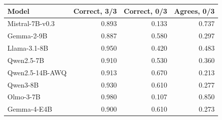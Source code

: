 \begin{tabular}{lrrr}
\toprule
Model & Correct, 3/3 & Correct, 0/3 & Agrees, 0/3 \\
\midrule
Mistral-7B-v0.3 & 0.893 & 0.133 & 0.737 \\
Gemma-2-9B & 0.887 & 0.580 & 0.297 \\
Llama-3.1-8B & 0.950 & 0.420 & 0.483 \\
Qwen2.5-7B & 0.910 & 0.530 & 0.360 \\
Qwen2.5-14B-AWQ & 0.913 & 0.670 & 0.213 \\
Qwen3-8B & 0.930 & 0.610 & 0.277 \\
Olmo-3-7B & 0.980 & 0.107 & 0.850 \\
Gemma-4-E4B & 0.900 & 0.610 & 0.273 \\
\bottomrule
\end{tabular}
